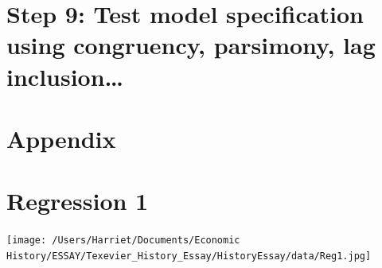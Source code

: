 \documentclass[11pt,preprint, authoryear]{elsarticle}
\let\origfigure\figure
\let\endorigfigure\endfigure
\renewenvironment{figure}[1][2] {
    \expandafter\origfigure\expandafter[H]
} {
    \endorigfigure
}
\numberwithin{equation}{section}
\numberwithin{figure}{section}
\numberwithin{table}{section}
\begin{document}
\hypertarget{step-9-test-model-specification-using-congruency-parsimony-lag-inclusion}{%
\section{Step 9: Test model specification using congruency, parsimony,
lag
inclusion\ldots{}}\label{step-9-test-model-specification-using-congruency-parsimony-lag-inclusion}}

\hypertarget{appendix}{%
\section*{Appendix}\label{appendix}}

\hypertarget{regression-1}{%
\section*{Regression 1}\label{regression-1}}

\begin{figure}
\centering
\texttt{[image: /Users/Harriet/Documents/Economic History/ESSAY/Texevier\_History\_Essay/HistoryEssay/data/Reg1.jpg]}
\caption{Alt Text}
\end{figure}


\end{document}
